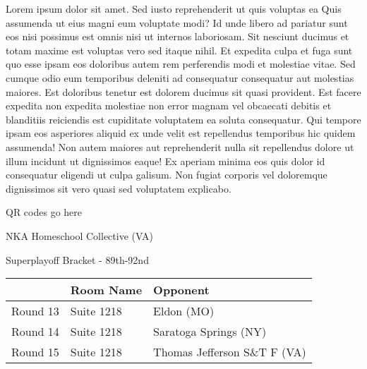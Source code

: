 \documentclass{article}%
\begin{document}
\vspace*{8pt}%
\linebreak%
\newline%
\newline%
Lorem ipsum dolor sit amet. Sed iusto reprehenderit ut quis voluptas ea Quis assumenda ut eius magni eum voluptate modi? Id unde libero ad pariatur sunt eos nisi possimus est omnis nisi ut internos laboriosam. Sit nesciunt ducimus et totam maxime est voluptas vero sed itaque nihil. Et expedita culpa et fuga sunt quo esse ipsam eos doloribus autem rem perferendis modi et molestiae vitae.\newline%
\newline%
Sed cumque odio eum temporibus deleniti ad consequatur consequatur aut molestias maiores. Est doloribus tenetur est dolorem ducimus sit quasi provident. Est facere expedita non expedita molestiae non error magnam vel obcaecati debitis et blanditiis reiciendis est cupiditate voluptatem ea soluta consequatur. Qui tempore ipsam eos asperiores aliquid ex unde velit est repellendus temporibus hic quidem assumenda!\newline%
\newline%
Non autem maiores aut reprehenderit nulla sit repellendus dolore ut illum incidunt ut dignissimos eaque! Ex aperiam minima eos quis dolor id consequatur eligendi ut culpa galisum. Non fugiat corporis vel doloremque dignissimos sit vero quasi sed voluptatem explicabo.\newline%
\newline%
%
\vspace*{30pt}%
\begin{center}%
\begin{Huge}%
QR codes go here%
\end{Huge}%
\end{center}%
\newpage%
\begin{center}%
\begin{Huge}%
NKA Homeschool Collective (VA)%
\end{Huge}%
\vspace*{8pt}%
\linebreak%
\begin{Large}%
Superplayoff Bracket {-} 89th{-}92nd%
\end{Large}%
\end{center}%
%
\begin{tabularx}{\textwidth}{|c|Y|Y|}%
\hline%
&Room Name&Opponent\\%
\hline%
Round 13&Suite 1218&Eldon (MO)\\%
Round 14&Suite 1218&Saratoga Springs (NY)\\%
Round 15&Suite 1218&Thomas Jefferson S\&T F (VA)\\%
\hline%
\end{tabularx}%
\end{document}
